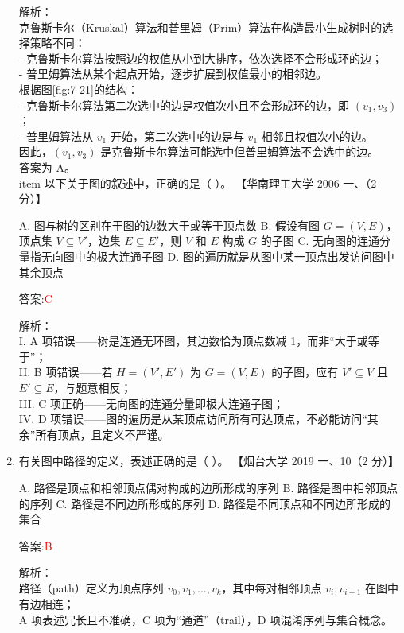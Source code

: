 \documentclass[lang=cn,newtx,10pt,scheme=chinese]{../../../elegantbook}
\begin{document}
\begin{enumerate}
        解析：\\
        克鲁斯卡尔（Kruskal）算法和普里姆（Prim）算法在构造最小生成树时的选择策略不同：\\
        - 克鲁斯卡尔算法按照边的权值从小到大排序，依次选择不会形成环的边；\\
        - 普里姆算法从某个起点开始，逐步扩展到权值最小的相邻边。\\
        根据图\ref{fig:7-21}的结构：\\
        - 克鲁斯卡尔算法第二次选中的边是权值次小且不会形成环的边，即 $(v_1, v_3)$；\\
        - 普里姆算法从 $v_1$ 开始，第二次选中的边是与 $v_1$ 相邻且权值次小的边。\\
        因此，$(v_1, v_3)$ 是克鲁斯卡尔算法可能选中但普里姆算法不会选中的边。\\
        答案为 A。
        \\item 以下关于图的叙述中，正确的是（ ）。  
        【华南理工大学 2006 一、（2 分）】
    
        A. 图与树的区别在于图的边数大于或等于顶点数  
        B. 假设有图 $G=(V,E)$，顶点集 $V\subseteq V'$，边集 $E\subseteq E'$，则 $V$ 和 $E$ 构成 $G$ 的子图  
        C. 无向图的连通分量指无向图中的极大连通子图  
        D. 图的遍历就是从图中某一顶点出发访问图中其余顶点  
    
        答案:\textcolor{red}{C}
    
        解析：\\
        I. A 项错误——树是连通无环图，其边数恰为顶点数减 1，而非“大于或等于”；\\
        II. B 项错误——若 $H=(V',E')$ 为 $G=(V,E)$ 的子图，应有 $V'\subseteq V$ 且 $E'\subseteq E$，与题意相反；\\
        III. C 项正确——无向图的连通分量即极大连通子图；\\
        IV. D 项错误——图的遍历是从某顶点访问所有可达顶点，不必能访问“其余”所有顶点，且定义不严谨。\\
    
    \item 有关图中路径的定义，表述正确的是（ ）。  
        【烟台大学 2019 一、10（2 分）】
    
        A. 路径是顶点和相邻顶点偶对构成的边所形成的序列  
        B. 路径是图中相邻顶点的序列  
        C. 路径是不同边所形成的序列  
        D. 路径是不同顶点和不同边所形成的集合  
    
        答案:\textcolor{red}{B}
    
        解析：\\
        路径（path）定义为顶点序列 $v_0,v_1,\dots,v_k$，其中每对相邻顶点 $v_i,v_{i+1}$ 在图中有边相连；\\
        A 项表述冗长且不准确，C 项为“通道”（trail），D 项混淆序列与集合概念。\\
    

\end{enumerate}
\end{document}
